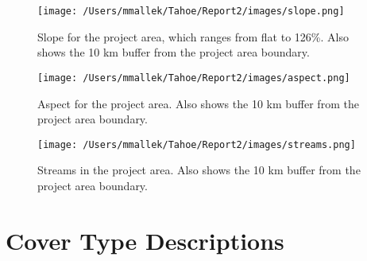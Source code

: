 \begin{figure}[htbp]
\centering
\texttt{[image: /Users/mmallek/Tahoe/Report2/images/slope.png]}
\caption{Slope for the project area, which ranges from flat to 126\%. Also shows the 10 km buffer from the project area boundary.} 
\label{slopemap}
\end{figure}

\begin{figure}[htbp]
\centering
\texttt{[image: /Users/mmallek/Tahoe/Report2/images/aspect.png]}
\caption{Aspect for the project area. Also shows the 10 km buffer from the project area boundary.} 
\label{aspectmap}
\end{figure}

\begin{figure}[htbp]
\centering
\texttt{[image: /Users/mmallek/Tahoe/Report2/images/streams.png]}
\caption{Streams in the project area. Also shows the 10 km buffer from the project area boundary.} 
\label{streamsmap}
\end{figure}

\chapter{Cover Type Descriptions}
\label{sec:covertypedesc}


